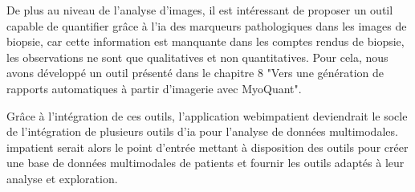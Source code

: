 De plus au niveau de l'analyse d'images, il est intéressant de proposer un outil capable de quantifier grâce à l'\gls{ia} des marqueurs pathologiques dans les images de biopsie, car cette information est manquante dans les comptes rendus de biopsie, les observations ne sont que qualitatives et non quantitatives. Pour cela, nous avons développé un outil présenté dans le chapitre 8 "Vers une génération de rapports automatiques à partir d’imagerie avec MyoQuant".


Grâce à l'intégration de ces outils, l'application web\gls{impatient} deviendrait le socle de l'intégration de plusieurs outils d'\gls{ia} pour l'analyse de données multimodales. \gls{impatient} serait alors le point d'entrée mettant à disposition des outils pour créer une base de données multimodales de patients et fournir les outils adaptés à leur analyse et exploration.